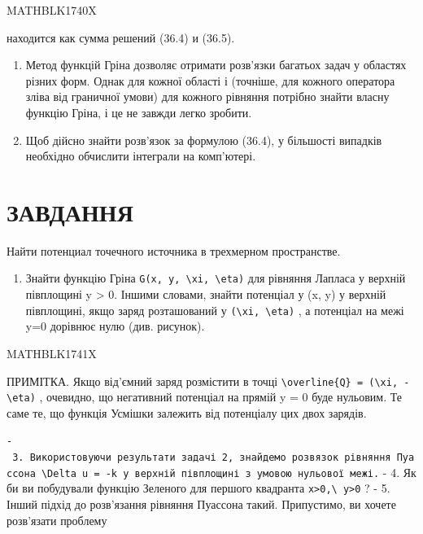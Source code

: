 \documentclass[
  ukrainian,
]{article}
\providecommand{\tightlist}{%
  \setlength{\itemsep}{0pt}\setlength{\parskip}{0pt}}
\begin{document}
MATHBLK1740X

находится как сумма решений (36.4) и (36.5).

\begin{enumerate}
\def\labelenumi{\arabic{enumi}.}
\setcounter{enumi}{2}
\item
  Метод функцій Гріна дозволяє отримати розв'язки багатьох задач у
  областях різних форм. Однак для кожної області і (точніше, для кожного
  оператора зліва від граничної умови) для кожного рівняння потрібно
  знайти власну функцію Гріна, і це не завжди легко зробити.
\item
  Щоб дійсно знайти розв'язок за формулою (36.4), у більшості випадків
  необхідно обчислити інтеграли на комп'ютері.
\end{enumerate}

\section{ЗАВДАННЯ}\label{ux437ux430ux432ux434ux430ux43dux43dux44f}

Найти потенциал точечного источника в трехмерном пространстве.

\begin{enumerate}
\def\labelenumi{\arabic{enumi}.}
\setcounter{enumi}{1}
\tightlist
\item
  Знайти функцію Гріна
  \texttt{G(x,\ y,\ \textbackslash{}xi,\ \textbackslash{}eta)} для
  рівняння Лапласа у верхній півплощині y \textgreater{} 0. Іншими
  словами, знайти потенціал у (x, y) у верхній півплощині, якщо заряд
  розташований у \texttt{(\textbackslash{}xi,\ \textbackslash{}eta)} , а
  потенціал на межі y=0 дорівнює нулю (див. рисунок).
\end{enumerate}

MATHBLK1741X

ПРИМІТКА. Якщо від'ємний заряд розмістити в точці
\texttt{\textbackslash{}overline\{Q\}\ =\ (\textbackslash{}xi,\ -\textbackslash{}eta)}
, очевидно, що негативний потенціал на прямій y = 0 буде нульовим. Те
саме те, що функція Усмішки залежить від потенціалу цих двох зарядів.

\texttt{-\ 3.\ Використовуючи\ результати\ задачі\ 2,\ знайдемо\ розв\textquotesingle{}язок\ рівняння\ Пуассона\ \textquotesingle{}\textbackslash{}Delta\ u\ =\ -k\textquotesingle{}\ у\ верхній\ півплощині\ з\ умовою\ нульової\ межі.}
- 4. Як би ви побудували функцію Зеленого для першого квадранта
\texttt{x\textgreater{}0,\textbackslash{}\ y\textgreater{}0} ? - 5.
Інший підхід до розв'язання рівняння Пуассона такий. Припустимо, ви
хочете розв'язати проблему
\end{document}
